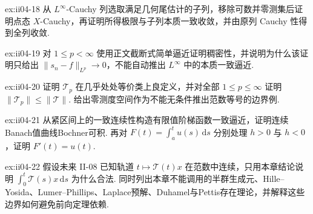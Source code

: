\begin{FAExercise}{ex:ii04-18}
从 \(\displaystyle L^\infty\)-Cauchy 列选取满足几何尾估计的子列，移除可数并零测集后证明点态 \(\displaystyle X\)-Cauchy，再证明所得极限与子列本质一致收敛，并由原列 Cauchy 性得到全列收敛.
\end{FAExercise}

\begin{FAExercise}{ex:ii04-19}
对 \(\displaystyle1\leqslant p<\infty\) 使用正文截断式简单逼近证明稠密性，并说明为什么该证明只给出 \(\displaystyle\|s_n-f\|_{L^p}\to0\)，不能自动推出 \(\displaystyle L^\infty\) 中的本质一致逼近.
\end{FAExercise}

\begin{FAExercise}{ex:ii04-20}
证明 \(\displaystyle\mathcal T_p\) 在几乎处处等价类上良定义，并对全部 \(\displaystyle1\leqslant p\leqslant\infty\) 证明 \(\displaystyle\|\mathcal T_p\|\leqslant\|\mathcal T\|\). 给出零测度空间作为不能无条件推出范数等号的边界例.
\end{FAExercise}

\begin{FAExercise}[连续曲线与基本微积分定理]{ex:ii04-21}
从紧区间上的一致连续性构造有限值阶梯函数一致逼近，证明连续Banach值曲线Bochner可积. 再对 \(\displaystyle F(t)=\int_a^tu(s)\,\mathrm{d}s\) 分别处理 \(\displaystyle h>0\) 与 \(\displaystyle h<0\)，证明 \(\displaystyle F'(t)=u(t)\).
\end{FAExercise}

\begin{FAExercise}[半群接口与Pettis边界辨析]{ex:ii04-22}
假设未来 II-08 已知轨道 \(\displaystyle t\mapsto\mathcal T(t)x\) 在范数中连续，只用本章结论说明 \(\displaystyle\int_0^t\mathcal T(s)x\,\mathrm{d}s\) 为什么合法. 同时列出本章不能调用的半群生成元、Hille--Yosida、Lumer--Phillips、Laplace预解、Duhamel与Pettis存在理论，并解释这些边界如何避免前向定理依赖.
\end{FAExercise}
